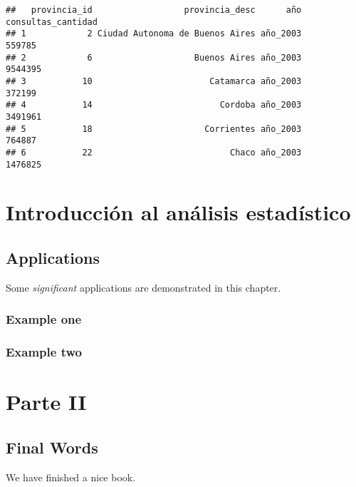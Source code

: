 \documentclass[spanish,]{book}
\begin{document}
\begin{verbatim}
##   provincia_id                  provincia_desc      año consultas_cantidad
## 1            2 Ciudad Autonoma de Buenos Aires año_2003             559785
## 2            6                    Buenos Aires año_2003            9544395
## 3           10                       Catamarca año_2003             372199
## 4           14                         Cordoba año_2003            3491961
## 5           18                      Corrientes año_2003             764887
## 6           22                           Chaco año_2003            1476825
\end{verbatim}

\part{Introducción al análisis
estadístico}\label{part-introduccion-al-analisis-estadistico}

\chapter{Applications}\label{applications}

Some \emph{significant} applications are demonstrated in this chapter.

\section{Example one}\label{example-one}

\section{Example two}\label{example-two}

\part{Parte II}\label{part-parte-ii}

\chapter{Final Words}\label{final-words}

We have finished a nice book.


\end{document}

